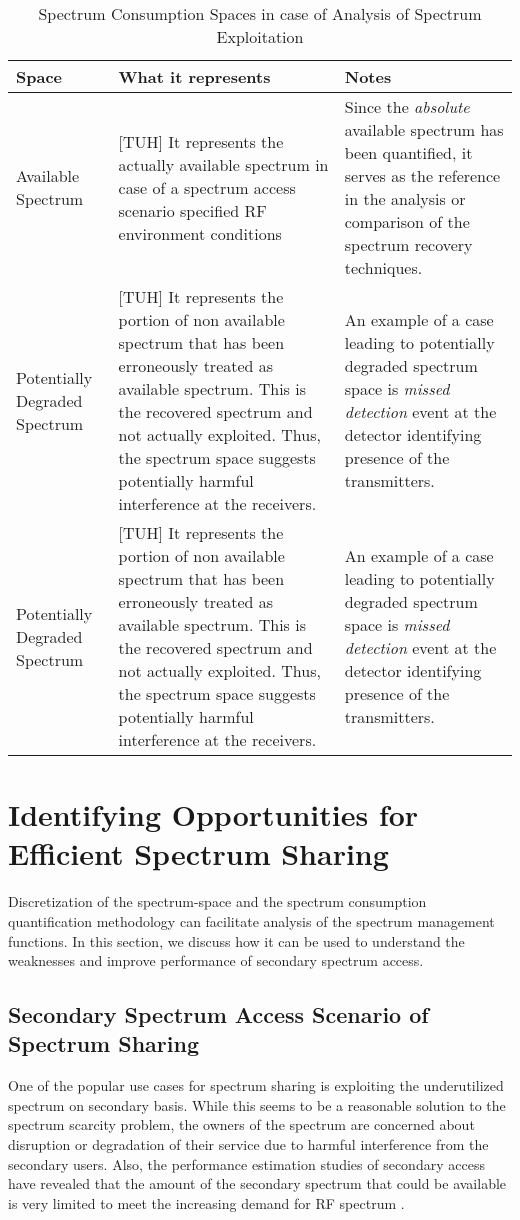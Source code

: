 \documentclass[journal,12pt,draftclsnofoot,onecolumn]{IEEEtran}
\begin{document}
\begin{table}[h!b!p!]
\label{table:SXSCS}
\caption{Spectrum Consumption Spaces in case of Analysis of Spectrum Exploitation}
\centering
\begin{tabular}{lp{5cm}p{5cm}}
\hline
Space & What it represents & Notes\\
\hline
Available Spectrum  & [TUH] It represents the actually available spectrum in case of a spectrum access scenario specified RF environment conditions & Since the \textit{absolute} available spectrum has been quantified, it serves as the reference in the analysis or comparison of the spectrum recovery techniques.\\
Potentially Degraded Spectrum & [TUH] It represents the portion of non available spectrum that has been erroneously treated as available spectrum. This is the recovered spectrum and not actually exploited. Thus, the spectrum space suggests potentially harmful interference at the receivers.& An example of a case leading to potentially degraded spectrum space is \textit{missed detection} event at the detector identifying presence of the transmitters.\\
Potentially Degraded Spectrum & [TUH] It represents the portion of non available spectrum that has been erroneously treated as available spectrum. This is the recovered spectrum and not actually exploited. Thus, the spectrum space suggests potentially harmful interference at the receivers.& An example of a case leading to potentially degraded spectrum space is \textit{missed detection} event at the detector identifying presence of the transmitters.\\
\hline
\end{tabular}
\end{table}

\section{Identifying Opportunities for Efficient Spectrum Sharing}
Discretization of the spectrum-space and the spectrum consumption quantification methodology can facilitate analysis of the spectrum management functions. In this section, we discuss how it can be used to understand the weaknesses and improve performance of secondary spectrum access. 
 
\subsection{Secondary Spectrum Access Scenario of Spectrum Sharing}
One of the popular use cases for spectrum sharing is exploiting the underutilized spectrum on secondary basis. While this seems to be a reasonable solution to the spectrum scarcity problem, the owners of the spectrum are concerned about disruption or degradation of their service due to harmful interference from the secondary users. Also, the performance estimation studies of secondary access have revealed that the amount of the secondary spectrum that could be available is very limited to meet the increasing demand for RF spectrum \cite{berk_wsc, osa_feasib}.
 
\end{document}
